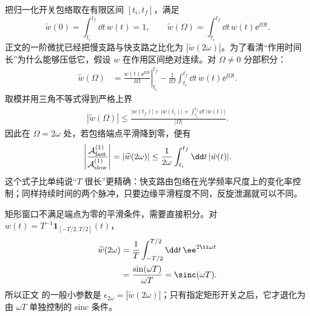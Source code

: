 \begin{derivation}[快分支振荡与长作用时间条件]
把归一化开关包络取在有限区间 $[t_i,t_f]$，满足
\[
 \widetilde w(0)=\int_{t_i}^{t_f}\dd t\,w(t)=1,
 \qquad
 \widetilde w(\Omega)=\int_{t_i}^{t_f}\dd t\,w(t)\ee^{\ii\Omega t}.
\]
正文的一阶微扰已经把慢支路与快支路之比化为
$|\widetilde w(2\omega)|$。为了看清“作用时间长”为什么能够压低它，假设 $w$ 在作用区间绝对连续。对 $\Omega\ne0$ 分部积分：
\begin{align*}
 \widetilde w(\Omega)
 &=\left.\frac{w(t)\ee^{\ii\Omega t}}{\ii\Omega}\right|_{t_i}^{t_f}
 -\frac1{\ii\Omega}\int_{t_i}^{t_f}\dd t\,
 \dot w(t)\ee^{\ii\Omega t}.
\end{align*}
取模并用三角不等式得到严格上界
\begin{align*}
 |\widetilde w(\Omega)|
 \le\frac{|w(t_f)|+|w(t_i)|
 +\int_{t_i}^{t_f}\dd t\,|\dot w(t)|}{|\Omega|}.
\end{align*}
因此在 $\Omega=2\omega$ 处，若包络端点平滑降到零，便有
\begin{equation*}
 \left|\frac{\mathcal A_{\rm fast}^{(1)}}{\mathcal A_{\rm slow}^{(1)}}\right|
 =|\widetilde w(2\omega)|
 \le\frac{1}{2\omega}
 \int_{t_i}^{t_f}\dd t\,|\dot w(t)|.
\end{equation*}
这个式子比单纯说“$T$ 很长”更精确：快支路由包络在光学频率尺度上的变化率控制；同样持续时间的两个脉冲，只要边缘平滑程度不同，反旋泄漏就可以不同。

矩形窗口不满足端点为零的平滑条件，需要直接积分。对
$w(t)=T^{-1}\mathbf 1_{[-T/2,T/2]}(t)$，
\begin{align*}
 \widetilde w(2\omega)
 &=\frac1T\int_{-T/2}^{T/2}\dd t\,\ee^{2\ii\omega t}\\
 &=\frac{\sin(\omega T)}{\omega T}
 =\sinc(\omega T).
\end{align*}
所以正文 的一般小参数是
$\epsilon_{2\omega}=|\widetilde w(2\omega)|$；只有指定矩形开关之后，它才退化为由 $\omega T$ 单独控制的 sinc 条件。
\end{derivation}



